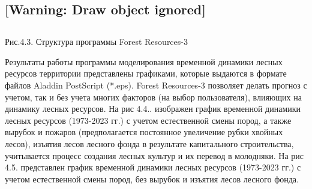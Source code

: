 \documentclass{report}
\begin{document}
\subsection[]{ [Warning: Draw object ignored]}
\subsection{}
\subsection{}
\subsection{}
\subsection{}
\subsection{}
\subsection{}
\subsection{}
\subsection{}
\subsection{}
Рис.4.3. Структура программы Forest Resources{}-3

Результаты работы программы моделирования временной динамики лесных ресурсов территории представлены графиками, которые
выдаются в формате файлов Aladdin PostScript (*.eps). Forest Resources{}-3 позволяет делать прогноз с учетом, так и без
учета многих факторов (на выбор пользователя), влияющих на динамику лесных ресурсов. На рис 4.4.. изображен график
временной динамики лесных ресурсов (1973-2023 гг.) с учетом естественной смены пород, а также вырубок и пожаров
(предполагается постоянное увеличение рубки хвойных лесов), изъятия лесов лесного фонда в результате капитального
строительства, учитывается процесс создания лесных культур и их перевод в молодняки. На рис 4.5. представлен график
временной динамики лесных ресурсов (1973-2023 гг.) с учетом естественной смены пород, без вырубок и изъятия лесов
лесного фонда. 
\end{document}
